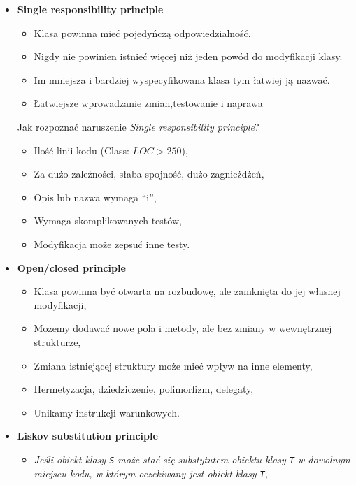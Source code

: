 \documentclass[../main.tex]{subfiles}
\begin{document}
    \begin{itemize}
        \item \textbf{Single responsibility principle}
        \begin{itemize}
            \item Klasa powinna mieć pojedyńczą odpowiedzialność.
            \item Nigdy nie powinien istnieć więcej niż jeden powód do modyfikacji klasy.
            \item Im mniejsza i bardziej wyspecyfikowana klasa tym łatwiej ją nazwać.
            \item Łatwiejsze wprowadzanie zmian,testowanie i naprawa
        \end{itemize}
        Jak rozpoznać naruszenie \textit{Single responsibility principle}?
        \begin{itemize}
            \item Ilość linii kodu (Class: $LOC > 250$),
            \item Za dużo zależności, słaba spojność, dużo zagnieżdżeń,
            \item Opis lub nazwa wymaga “i”,
            \item Wymaga skomplikowanych testów,
            \item Modyfikacja może zepsuć inne testy.
        \end{itemize}
        \item \textbf{Open/closed principle}
        \begin{itemize}
            \item Klasa powinna być otwarta na rozbudowę, ale zamknięta do jej własnej modyfikacji,
            \item Możemy dodawać nowe pola i metody, ale bez zmiany w wewnętrznej strukturze,
            \item Zmiana istniejącej struktury może mieć wpływ na inne elementy,
            \item Hermetyzacja, dziedziczenie, polimorfizm, delegaty,
            \item Unikamy instrukcji warunkowych.
        \end{itemize}
        \item \textbf{Liskov substitution principle}
        \begin{itemize}
            \item \textit{Jeśli obiekt klasy
                \texttt{S} może stać się substytutem obiektu klasy \texttt{T} w
                dowolnym miejscu kodu, w którym oczekiwany jest obiekt klasy \texttt{T},
}
\end{itemize}
\end{itemize}
\end{document}
